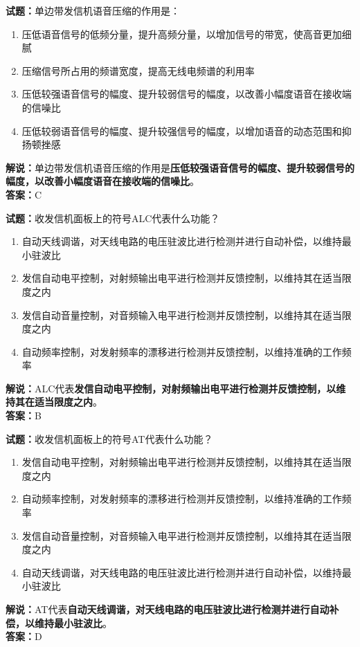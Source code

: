 \documentclass{ctexbook}
\begin{document}
\bigskip


\noindent\textbf{试题：}单边带发信机语音压缩的作用是：
\begin{enumerate}[leftmargin=3em]
\item 压低语音信号的低频分量，提升高频分量，以增加信号的带宽，使高音更加细腻
\item 压缩信号所占用的频谱宽度，提高无线电频谱的利用率
\item 压低较强语音信号的幅度、提升较弱信号的幅度，以改善小幅度语音在接收端的信噪比
\item 压低较弱语音信号的幅度、提升较强信号的幅度，以增加语音的动态范围和抑扬顿挫感
\end{enumerate}
\noindent\textbf{解说：}单边带发信机语音压缩的作用是\textbf{压低较强语音信号的幅度、提升较弱信号的幅度，以改善小幅度语音在接收端的信噪比}。\\\noindent\textbf{答案：}C




\bigskip


\noindent\textbf{试题：}收发信机面板上的符号ALC代表什么功能？
\begin{enumerate}[leftmargin=3em]
\item 自动天线调谐，对天线电路的电压驻波比进行检测并进行自动补偿，以维持最小驻波比
\item 发信自动电平控制，对射频输出电平进行检测并反馈控制，以维持其在适当限度之内
\item 发信自动音量控制，对音频输入电平进行检测并反馈控制，以维持其在适当限度之内
\item 自动频率控制，对发射频率的漂移进行检测并反馈控制，以维持准确的工作频率
\end{enumerate}
\noindent\textbf{解说：}ALC代表\textbf{发信自动电平控制，对射频输出电平进行检测并反馈控制，以维持其在适当限度之内}。\\\noindent\textbf{答案：}B



\bigskip


\noindent\textbf{试题：}收发信机面板上的符号AT代表什么功能？
\begin{enumerate}[leftmargin=3em]
\item 发信自动电平控制，对射频输出电平进行检测并反馈控制，以维持其在适当限度之内
\item 自动频率控制，对发射频率的漂移进行检测并反馈控制，以维持准确的工作频率
\item 发信自动音量控制，对音频输入电平进行检测并反馈控制，以维持其在适当限度之内
\item 自动天线调谐，对天线电路的电压驻波比进行检测并进行自动补偿，以维持最小驻波比
\end{enumerate}
\noindent\textbf{解说：}AT代表\textbf{自动天线调谐，对天线电路的电压驻波比进行检测并进行自动补偿，以维持最小驻波比}。\\\noindent\textbf{答案：}D
\end{document}
